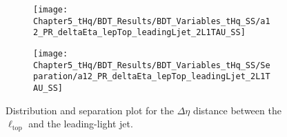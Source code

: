 \begin{comment}
\begin{figure}[h]
\centering
\begin{subfigure}{.45\textwidth}
  \centering
  \texttt{[image: Chapter5\_tHq/BDT\_Results/BDT\_Variables\_tHq\_SS/a03\_PR\_lepTop\_pt\_2L1TAU\_SS]}
\end{subfigure}%
\begin{subfigure}{.55\textwidth}
  \centering
  \texttt{[image: Chapter5\_tHq/BDT\_Results/BDT\_Variables\_tHq\_SS/Separation/a03\_PR\_lepTop\_pt\_2L1TAU\_SS]}
\end{subfigure}
\caption{Distribution and separation plot for the \pT of the light-flavoured lepton originated from the top-quark-decay system.}
\label{fig:Appendix:BDTVARS:tHqSS:a03_PR_lepTop_pt}
\end{figure}


\begin{figure}[h]
\centering
\begin{subfigure}{.45\textwidth}
  \centering
  \texttt{[image: Chapter5\_tHq/BDT\_Results/BDT\_Variables\_tHq\_SS/a01\_PR\_DeltaEtaForwardLjetLeadingBjet\_2L1TAU\_SS]}
\end{subfigure}%
\begin{subfigure}{.55\textwidth}
  \centering
  \texttt{[image: Chapter5\_tHq/BDT\_Results/BDT\_Variables\_tHq\_SS/Separation/a01\_PR\_DeltaEtaForwardLjetLeadingBjet\_2L1TAU\_SS]}
\end{subfigure}
\caption{Distribution and separation plot for the $\Delta \eta$ distance between the forward non-\btagged jet
and the leading \btagged jet. The forward jet is typically the spectator jet and the \btagged jet is the one that originated
from the top-quark-decay system. Therefore 
For the \tHq signal, on average, these two jets are more separated than in the backgrounds.
This distribution is the same as 
for Figure~\ref{fig:Appendix:BDTVARS:tHqOS:a10_PR_DeltaEtaForwardLjetLeadingBjet} but for
the \dilepSStau channel.}
\label{fig:Appendix:BDTVARS:tHqSS:a01_PR_DeltaEtaForwardLjetLeadingBjet}
\end{figure}
\end{comment}

\begin{figure}[h]
\centering
\begin{subfigure}{.45\textwidth}
  \centering
  \texttt{[image: Chapter5\_tHq/BDT\_Results/BDT\_Variables\_tHq\_SS/a12\_PR\_deltaEta\_lepTop\_leadingLjet\_2L1TAU\_SS]}
\end{subfigure}%
\begin{subfigure}{.55\textwidth}
  \centering
  \texttt{[image: Chapter5\_tHq/BDT\_Results/BDT\_Variables\_tHq\_SS/Separation/a12\_PR\_deltaEta\_lepTop\_leadingLjet\_2L1TAU\_SS]}
\end{subfigure}
\caption{Distribution and separation plot for the $\Delta \eta$ distance between the $\ell_{\text{top}}$ and the leading-light jet.}
\label{fig:Appendix:BDTVARS:tHqSS:a12_PR_deltaEta_lepTop_leadingLjet}
\end{figure}

